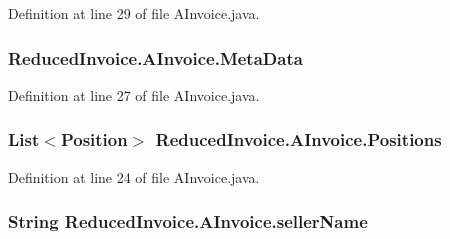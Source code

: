 Definition at line 29 of file A\+Invoice.\+java.

\subsubsection[{\texorpdfstring{Meta\+Data}{MetaData}}]{ Reduced\+Invoice.\+A\+Invoice.\+Meta\+Data\hspace{0.3cm}{\ttfamily [protected]}}\hypertarget{class_reduced_invoice_1_1_a_invoice_a7561c82ce51807a2c48a9b80cf45b411}{}\label{class_reduced_invoice_1_1_a_invoice_a7561c82ce51807a2c48a9b80cf45b411}


Definition at line 27 of file A\+Invoice.\+java.

\subsubsection[{\texorpdfstring{Positions}{Positions}}]{\setlength{\rightskip}{0pt plus 5cm}List$<${\bf Position}$>$ Reduced\+Invoice.\+A\+Invoice.\+Positions\hspace{0.3cm}{\ttfamily [protected]}}\hypertarget{class_reduced_invoice_1_1_a_invoice_a5b51f1865386bd021580507c7133f69a}{}\label{class_reduced_invoice_1_1_a_invoice_a5b51f1865386bd021580507c7133f69a}


Definition at line 24 of file A\+Invoice.\+java.

\subsubsection[{\texorpdfstring{seller\+Name}{sellerName}}]{\setlength{\rightskip}{0pt plus 5cm}String Reduced\+Invoice.\+A\+Invoice.\+seller\+Name\hspace{0.3cm}{\ttfamily [protected]}}\hypertarget{class_reduced_invoice_1_1_a_invoice_ae00a97e1c74841fe0b0b43fccd1da24d}{}\label{class_reduced_invoice_1_1_a_invoice_ae00a97e1c74841fe0b0b43fccd1da24d}


